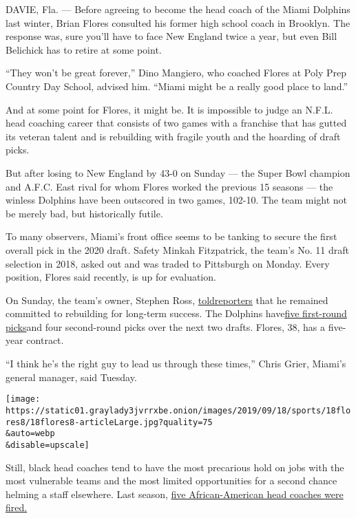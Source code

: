 DAVIE, Fla. --- Before agreeing to become the head coach of the Miami
Dolphins last winter, Brian Flores consulted his former high school
coach in Brooklyn. The response was, sure you'll have to face New
England twice a year, but even Bill Belichick has to retire at some
point.

``They won't be great forever,'' Dino Mangiero, who coached Flores at
Poly Prep Country Day School, advised him. ``Miami might be a really
good place to land.''

And at some point for Flores, it might be. It is impossible to judge an
N.F.L. head coaching career that consists of two games with a franchise
that has gutted its veteran talent and is rebuilding with fragile youth
and the hoarding of draft picks.

But after losing to New England by 43-0 on Sunday --- the Super Bowl
champion and A.F.C. East rival for whom Flores worked the previous 15
seasons --- the winless Dolphins have been outscored in two games,
102-10. The team might not be merely bad, but historically futile.

To many observers, Miami's front office seems to be tanking to secure
the first overall pick in the 2020 draft. Safety Minkah Fitzpatrick, the
team's No. 11 draft selection in 2018, asked out and was traded to
Pittsburgh on Monday. Every position, Flores said recently, is up for
evaluation.

On Sunday, the team's owner, Stephen Ross,
\href{https://www.miamiherald.com/sports/nfl/miami-dolphins/article235100657.html}{told}\href{https://www.miamiherald.com/sports/nfl/miami-dolphins/article235100657.html}{reporters}
that he remained committed to rebuilding for long-term success. The
Dolphins
have\href{https://www.miamiherald.com/article235137292.html}{five
first-round picks}and four second-round picks over the next two drafts.
Flores, 38, has a five-year contract.

``I think he's the right guy to lead us through these times,'' Chris
Grier, Miami's general manager, said Tuesday.

\texttt{[image: https://static01.graylady3jvrrxbe.onion/images/2019/09/18/sports/18flores8/18flores8-articleLarge.jpg?quality=75\\\&auto=webp\\\&disable=upscale]}

Still, black head coaches tend to have the most precarious hold on jobs
with the most vulnerable teams and the most limited opportunities for a
second chance helming a staff elsewhere. Last season,
\href{https://www.nytimes3xbfgragh.onion/2018/12/31/sports/nfl-black-coaches-fired.html}{five
African-American head coaches were fired.}

